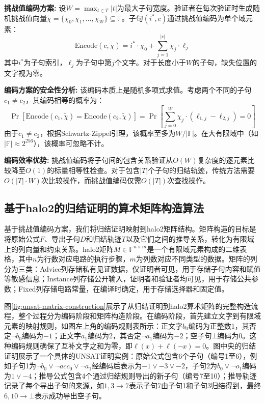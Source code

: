 \textbf{挑战值编码方案:}
设$W = \max_{t \in T} |t|$为最大子句宽度。验证者在每次验证时生成随机挑战值向量$\tilde{\chi} = \{\chi_0, \chi_1, \ldots, \chi_W\} \subseteq \mathbb{F}$。子句$(i^*, c)$通过挑战值编码为单个域元素：
$$\text{Encode}(c, \tilde{\chi}) = i^* \cdot \chi_0 + \sum_{j=1}^{|c|} \chi_j \cdot \ell_j$$
其中$i^*$为子句索引，$\ell_j$为子句中第$j$个文字。对于长度小于$W$的子句，缺失位置的文字视为零。

\textbf{编码方案的安全性分析:}
该编码本质上是随机多项式求值。考虑两个不同的子句$c_1 \neq c_2$，其编码相等的概率为：
$$\Pr[\text{Encode}(c_1, \tilde{\chi}) = \text{Encode}(c_2, \tilde{\chi})] = \Pr\left[\sum_{j=0}^{W} \chi_j \cdot (\ell_{1,j} - \ell_{2,j}) = 0\right]$$
由于$c_1 \neq c_2$，根据Schwartz-Zippel引理，该概率至多为$W/|\mathbb{F}|$。在大有限域中（如$|\mathbb{F}| \approx 2^{256}$），该概率可忽略不计。

\textbf{编码效率优势:}
挑战值编码将子句间的包含关系验证从$O(W)$复杂度的逐元素比较降至$O(1)$的标量相等性检查。对于包含$|T|$个子句的归结轨迹，传统方法需要$O(|T| \cdot W)$次比较操作，而挑战值编码仅需$O(|T|)$次查找操作。

\subsection{基于halo2的归结证明的算术矩阵构造算法}\label{sec:unsat-matrix-construction}

基于挑战值编码方案，我们将归结证明映射到halo2矩阵结构。矩阵构造的目标是将原始公式$F$、导出子句$D$和归结轨迹$T$以及它们之间的推导关系，转化为有限域上的列向量和约束关系。halo2矩阵$M \in \mathbb{F}^{n \times m}$是一个有限域元素构成的二维表格，其中$n$为行数对应电路的执行步骤，$m$为列数对应不同类型的数据。矩阵的列分为三类：Advice列存储私有见证数据，仅证明者可见，用于存储子句内容和赋值等敏感信息；Instance列存储公开输入，证明者和验证者均可见，用于存储公共参数；Fixed列存储电路常量，在编译时确定，用于存储选择器和固定值。

图\ref{fig:unsat-matrix-construction}展示了从归结证明到halo2算术矩阵的完整构造流程，整个过程分为编码阶段和矩阵构造阶段。在编码阶段，首先建立文字到有限域元素的映射规则，如图左上角的编码规则表所示：正文字$b_0$编码为正整数1，其否定$\neg b_0$编码为$-1$；正文字$a_1$编码为2，其否定$\neg a_1$编码为$-2$；空子句$\bot$编码为0。这种编码规则确保了互补文字之和为零，即$\ell(x) + \ell(\neg x) = 0$。图中央的归结证明展示了一个具体的UNSAT证明实例：原始公式包含6个子句（编号1至6），例如子句1为$\neg b_0 \vee \neg acc_0 \vee \neg a_1$经编码后表示为$-1 \vee -3 \vee -2$，子句2为$b_0 \vee \neg o_1$编码为$1 \vee -4$；推导公式包含4个通过归结规则导出的新子句（编号7至10）；推导轨迹记录了每个导出子句的来源，如$1, 3 \rightarrow 7$表示子句7由子句1和子句3归结得到，最终$6, 10 \rightarrow \bot$表示成功导出空子句。


